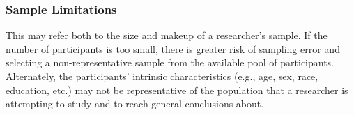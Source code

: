 \subsubsection{Sample Limitations}
This may refer both to the size and makeup of a researcher's sample. If the number of participants is too small, there is greater risk of sampling error and selecting a non-representative sample from the available pool of participants. Alternately, the participants' intrinsic characteristics (e.g., age, sex, race, education, etc.) may not be representative of the population that a researcher is attempting to study and to reach general conclusions about.